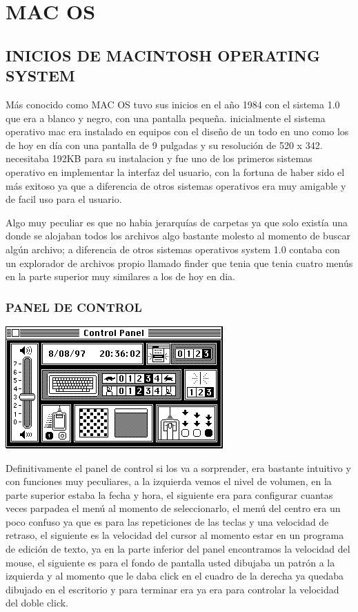 \chapter*{MAC OS}

\section*{INICIOS DE MACINTOSH OPERATING SYSTEM}
Más conocido como MAC OS tuvo sus inicios en el año 1984 con
el sistema 1.0 que era a blanco y negro, con una pantalla
pequeña. inicialmente el sistema operativo mac era instalado en
equipos con el diseño de un todo en uno como los de hoy en día
con una pantalla de 9 pulgadas y su resolución de 520 x 342.
necesitaba 192KB para su instalacion y fue uno de los primeros
sistemas operativo en implementar la interfaz del usuario, con la
fortuna de haber sido el más exitoso ya que a diferencia de otros
sistemas operativos era muy amigable y de facil uso para el
usuario.

Algo muy peculiar es que no habia jerarquías de carpetas ya que
solo existía una donde se alojaban todos los archivos algo
bastante molesto al momento de buscar algún archivo; a
diferencia de otros sistemas operativos system 1.0 contaba con
un explorador de archivos propio llamado finder que tenia que
tenia cuatro menús en la parte superior muy similares a los de
hoy en dia.

\subsection*{PANEL DE CONTROL}

\includegraphics[scale=0.5]{img/cp09/img0901.png}

Definitivamente el
panel de control si los
va a sorprender, era
bastante intuitivo y
con funciones muy
peculiares, a la
izquierda vemos el
nivel de volumen, en
la parte superior
estaba la fecha y hora,
el siguiente era para
configurar cuantas
veces parpadea el menú al momento de seleccionarlo,
el menú del centro era un poco confuso ya que es para las
repeticiones de las teclas y una velocidad de retraso, el
siguiente es la velocidad del cursor al momento estar en un
programa de edición de texto, ya en la parte inferior del panel
encontramos la velocidad del mouse, el siguiente es para el
fondo de pantalla usted dibujaba un patrón a la izquierda y al
momento que le daba click en el cuadro de la derecha ya
quedaba dibujado en el escritorio y para terminar era ya era
para controlar la velocidad del doble click.

